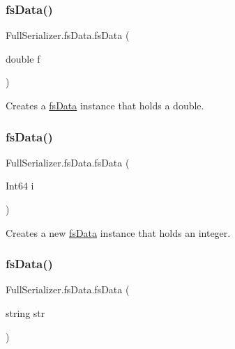 \subsubsection{\texorpdfstring{fs\+Data()}{fsData()}\hspace{0.1cm}{\footnotesize\ttfamily [3/7]}}
{\footnotesize\ttfamily Full\+Serializer.\+fs\+Data.\+fs\+Data (\begin{DoxyParamCaption}\item[{double}]{f }\end{DoxyParamCaption})\hspace{0.3cm}{\ttfamily [inline]}}



Creates a \hyperlink{class_full_serializer_1_1fs_data}{fs\+Data} instance that holds a double. 

\mbox{\label{class_full_serializer_1_1fs_data_ab942e5e4fb36b7e815ce0f4195cc84da}} 
\subsubsection{\texorpdfstring{fs\+Data()}{fsData()}\hspace{0.1cm}{\footnotesize\ttfamily [4/7]}}
{\footnotesize\ttfamily Full\+Serializer.\+fs\+Data.\+fs\+Data (\begin{DoxyParamCaption}\item[{Int64}]{i }\end{DoxyParamCaption})\hspace{0.3cm}{\ttfamily [inline]}}



Creates a new \hyperlink{class_full_serializer_1_1fs_data}{fs\+Data} instance that holds an integer. 

\mbox{\label{class_full_serializer_1_1fs_data_a18d00eb27ffcbbd57ab7372856ae30f7}} 
\subsubsection{\texorpdfstring{fs\+Data()}{fsData()}\hspace{0.1cm}{\footnotesize\ttfamily [5/7]}}
{\footnotesize\ttfamily Full\+Serializer.\+fs\+Data.\+fs\+Data (\begin{DoxyParamCaption}\item[{string}]{str }\end{DoxyParamCaption})\hspace{0.3cm}{\ttfamily [inline]}}



